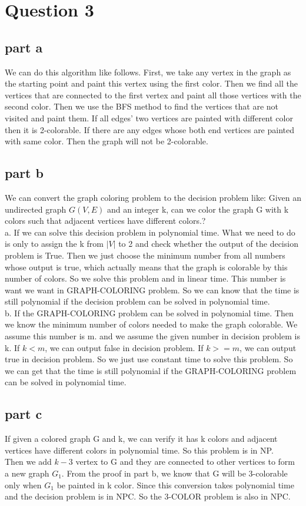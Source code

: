 \documentclass[paper=a4, fontsize=11pt]{scrartcl} %
\numberwithin{equation}{section} %
\numberwithin{figure}{section} %
\numberwithin{table}{section} %
\begin{document}
\section{\textbf{Question 3}}
\subsection{\textbf{part a}}
We can do this algorithm like follows. First, we take any vertex in the graph as the starting point and paint this vertex using the first color. Then we find all the vertices that are connected to the first vertex and paint all those vertices with the second color. Then we use the BFS method to find the vertices that are not visited and paint them. If all edges' two vertices are painted with different color then it is 2-colorable. If there are any edges whose both end vertices are painted with same color. Then the graph will not be 2-colorable.

\subsection{\textbf{part b}}
We can convert the graph coloring problem to the decision problem like: Given an undirected graph $G(V,E)$ and an integer k, can we color the graph G with k colors such that adjacent vertices have different colors.?\\
a. If we can solve this decision problem in polynomial time. What we need to do is only to assign the k from $|V|$ to 2 and check whether the output of the decision problem is True. Then we just choose the minimum number from all numbers whose output is true, which actually means that the graph is colorable by this number of colors. So we solve this problem and  in linear time. This number is want we want in GRAPH-COLORING problem. So we can know that the time is still polynomial if the decision problem can be solved in polynomial time.\\
b. If the GRAPH-COLORING problem can be solved in polynomial time. Then we know the minimum number of colors needed to make the graph colorable. We assume this number is m. and we assume the given number in decision problem is k. If $k<m$, we can output false in decision problem. If $k>=m$, we can output true in decision problem. So we just use constant time to solve this problem. So we can get that the time is still polynomial if the GRAPH-COLORING problem can be solved in polynomial time.

\subsection{\textbf{part c}}
If given a colored graph G and k, we can verify it has k colors and adjacent vertices have different colors in polynomial time. So this problem is in NP. \\
Then we add $k-3$ vertex to G and they are  connected to other vertices to form a new graph $G_1$. From the proof in part b, we know that G will be 3-colorable only when $G_1$ be painted in k color. Since this conversion takes polynomial time and the decision problem is in NPC. So the 3-COLOR problem is also in NPC.
\end{document}
